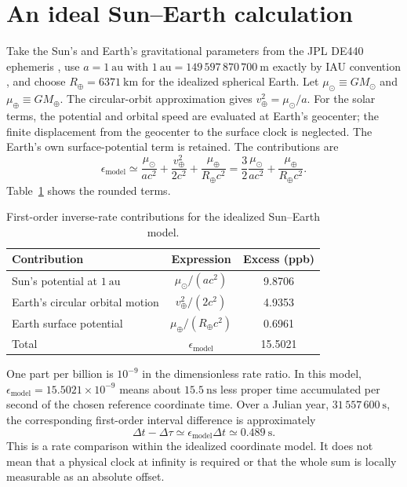 \documentclass[12pt]{article}
\begin{document}
\section{An ideal Sun--Earth calculation}

Take the Sun's and Earth's gravitational parameters from the JPL DE440 ephemeris \cite{Park2021}, use $a=1\ \mathrm{au}$ with $1\ \mathrm{au}=149\,597\,870\,700\ \mathrm{m}$ exactly by IAU convention \cite{IAU2012}, and choose $R_{\oplus}=6371\ \mathrm{km}$ for the idealized spherical Earth. Let $\mu_{\odot}\equiv GM_{\odot}$ and $\mu_{\oplus}\equiv GM_{\oplus}$. The circular-orbit approximation gives $v_{\oplus}^2=\mu_{\odot}/a$. For the solar terms, the potential and orbital speed are evaluated at Earth's geocenter; the finite displacement from the geocenter to the surface clock is neglected. The Earth's own surface-potential term is retained. The contributions are
\begin{equation}
  \epsilon_{\mathrm{model}}
  \simeq\frac{\mu_{\odot}}{ac^2}
   +\frac{v_{\oplus}^2}{2c^2}
   +\frac{\mu_{\oplus}}{R_{\oplus}c^2}
  =\frac{3}{2}\frac{\mu_{\odot}}{ac^2}
   +\frac{\mu_{\oplus}}{R_{\oplus}c^2}.
  \label{eq:sun-earth-ledger}
\end{equation}
Table~\ref{tab:ledger} shows the rounded terms.

\begin{table}[ht]
  \centering
  \caption{First-order inverse-rate contributions for the idealized Sun--Earth model.}
  \label{tab:ledger}
  \begin{tabular}{lcc}
    \toprule
    Contribution & Expression & Excess (ppb) \\
    \midrule
    Sun's potential at $1\ \mathrm{au}$
      & $\mu_{\odot}/(ac^2)$ & 9.8706 \\
    Earth's circular orbital motion
      & $v_{\oplus}^2/(2c^2)$ & 4.9353 \\
    Earth surface potential
      & $\mu_{\oplus}/(R_{\oplus}c^2)$ & 0.6961 \\
    \midrule
    Total
      & $\epsilon_{\mathrm{model}}$ & 15.5021 \\
    \bottomrule
  \end{tabular}
\end{table}

One part per billion is $10^{-9}$ in the dimensionless rate ratio. In this model, $\epsilon_{\mathrm{model}}=15.5021\times10^{-9}$ means about $15.5\ \mathrm{ns}$ less proper time accumulated per second of the chosen reference coordinate time. Over a Julian year, $31\,557\,600\ \mathrm{s}$, the corresponding first-order interval difference is approximately
\begin{equation}
  \Delta t-\Delta\tau
  \simeq\epsilon_{\mathrm{model}}\Delta t
  \simeq0.489\ \mathrm{s}.
  \label{eq:annual-lag}
\end{equation}
This is a rate comparison within the idealized coordinate model. It does not mean that a physical clock at infinity is required or that the whole sum is locally measurable as an absolute offset.
\end{document}

